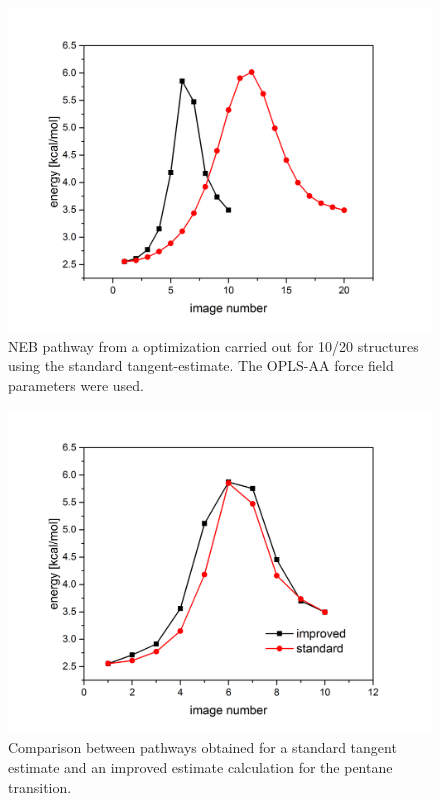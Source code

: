 \documentclass[a4paper,11pt]{scrartcl}
\begin{document}
\begin{itemize}
\begin{itemize}
\begin{figure}[H]
		\center
		\includegraphics[scale=0.4]{NEB/pentane_standard_10_20.png}\caption{NEB pathway from a optimization carried out for 10/20 structures using the standard tangent-estimate. The OPLS-AA force field parameters were used.}
\label{fig:}
\end{figure}

\begin{figure}[H]
		\center
		\includegraphics[scale=0.4]{NEB/pentane_standard_improved.png}\caption{Comparison between pathways obtained for a standard tangent estimate and an improved estimate calculation for the pentane transition.}
\label{fig:}
\end{figure}


\end{itemize}
\end{itemize}
\end{document}
